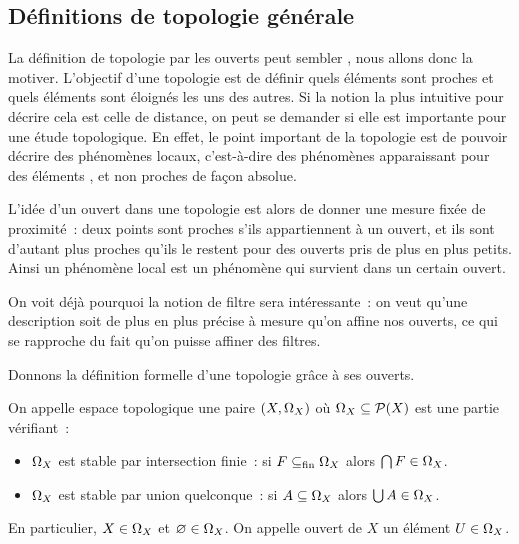 \subsection{Définitions de topologie générale}

La définition de topologie par les ouverts peut sembler , nous
allons donc la motiver. L'objectif d'une topologie est de définir
quels éléments sont proches et quels éléments sont éloignés les uns des autres.
Si la notion la plus intuitive pour décrire cela est celle de distance, on peut
se demander si elle est importante pour une étude topologique. En effet, le
point important de la topologie est de pouvoir décrire des phénomènes locaux,
c'est-à-dire des phénomènes apparaissant pour des éléments
, et non proches de façon absolue.

L'idée d'un ouvert dans une topologie est alors de donner une mesure fixée de
proximité~: deux points sont proches s'ils appartiennent à un ouvert, et ils
sont d'autant plus proches qu'ils le restent pour des ouverts pris de plus en
plus petits. Ainsi un phénomène local est un phénomène qui survient dans un
certain ouvert.

On voit déjà pourquoi la notion de filtre sera intéressante~: on veut qu'une
description soit de plus en plus précise à mesure qu'on affine nos ouverts,
ce qui se rapproche du fait qu'on puisse affiner des filtres.

Donnons la définition formelle d'une topologie grâce à ses ouverts.

\begin{definition}
  On appelle espace topologique une paire $(X,\Omega_{X})$ où
  $\Omega_{X}\subseteq\mathcal{P}(X)$ est une partie vérifiant~:
  \begin{itemize}
  \item $\Omega_{X}$ est stable par intersection finie~: si $F\subseteq_{\mathrm{fin}} \Omega_{X}$
    alors $\bigcap F \in \Omega_{X}$.
  \item $\Omega_{X}$ est stable par union quelconque~: si
    $A\subseteq \Omega_{X}$ alors $\bigcup A \in \Omega_{X}$.
  \end{itemize}

  En particulier, $X\in \Omega_{X}$ et $\varnothing\in \Omega_{X}$. On appelle
  ouvert de $X$ un élément $U\in\Omega_{X}$.
\end{definition}

